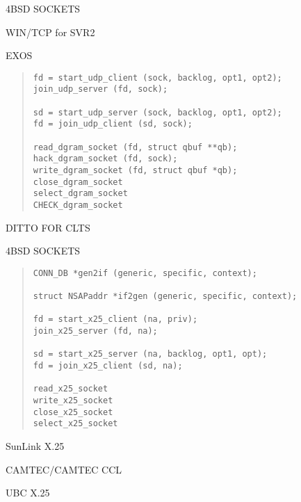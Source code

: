 \begin{bwslide}

\begin{nrtc}
\item	4BSD SOCKETS

\item	WIN/TCP for SVR2

\item	EXOS
\end{nrtc}
\end{bwslide}


\begin{bwslide}

\begin{quote}\small\begin{verbatim}
fd = start_udp_client (sock, backlog, opt1, opt2);
join_udp_server (fd, sock);

sd = start_udp_server (sock, backlog, opt1, opt2);
fd = join_udp_client (sd, sock);

read_dgram_socket (fd, struct qbuf **qb);
hack_dgram_socket (fd, sock);
write_dgram_socket (fd, struct qbuf *qb);
close_dgram_socket
select_dgram_socket
CHECK_dgram_socket
\end{verbatim}\end{quote}
DITTO FOR CLTS
\end{bwslide}


\begin{bwslide}

\begin{nrtc}
\item	4BSD SOCKETS
\end{nrtc}
\end{bwslide}


\begin{bwslide}

\begin{quote}\small\begin{verbatim}
CONN_DB *gen2if (generic, specific, context);

struct NSAPaddr *if2gen (generic, specific, context);

fd = start_x25_client (na, priv);
join_x25_server (fd, na);

sd = start_x25_server (na, backlog, opt1, opt);
fd = join_x25_client (sd, na);

read_x25_socket
write_x25_socket
close_x25_socket
select_x25_socket
\end{verbatim}\end{quote}
\end{bwslide}


\begin{bwslide}

\begin{nrtc}
\item	SunLink X.25

\item	CAMTEC/CAMTEC CCL

\item	UBC X.25
\end{nrtc}
\end{bwslide}

